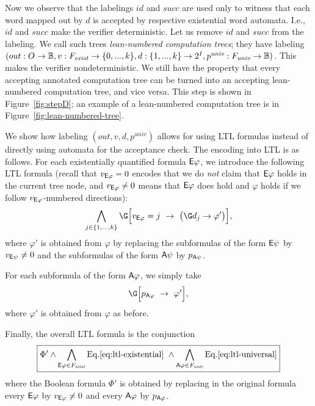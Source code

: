 
Now we observe that the labelings $id$ and $succ$
are used only to witness that each word mapped out by $d$
is accepted by respective existential word automata.
I.e., $id$ and $succ$ make the verifier deterministic.
Let us remove $id$ and $succ$ from the labeling.
We call such trees \emph{lean-numbered computation trees};
they have labeling
$
(
out:O \to \mathbb{B}, 
v:F_\textit{exist} \to \{0,...,k\},
d:\{1,...,k\} \to {2^I},
p^\textit{univ}: F_\textit{univ} \to \mathbb{B}
)
$.
This makes the verifier nondeterministic.
We still have the property that
every accepting annotated computation tree can be turned into
an accepting lean-numbered computation tree,
and vice versa.
This step is shown in Figure~\ref{fig:stepD};
an example of a lean-numbered computation tree is in Figure~\ref{fig:lean-numbered-tree}.

We show how labeling $(out,v,d,p^\textit{univ})$ 
allows for using LTL formulas instead of directly using automata for the acceptance check.
The encoding into LTL is as follows.
\li
\- For each existentially quantified formula ${\operatorname{\mathsf{E}}}\varphi$,
   we introduce the following LTL formula
   (recall that $v_{{\operatorname{\mathsf{E}}}\varphi} = 0$ encodes that we do \emph{not} claim that ${\operatorname{\mathsf{E}}}\varphi$ holds in the current     tree node,
    and $v_{{\operatorname{\mathsf{E}}}\varphi} \neq 0$ means that ${\operatorname{\mathsf{E}}}\varphi$ does hold
    and $\varphi$ holds if we follow $v_{{\operatorname{\mathsf{E}}}\varphi}$-numbered directions):
   \begin{equation}\label{eq:ltl-existential}
   \bigwedge_{j \in \{1,...,k\}} \G\Big[ v_{\E\varphi} = j ~\impl~ \big( \G d_j \impl \varphi'\big) \Big],
   \end{equation}
   where $\varphi'$ is obtained from $\varphi$
   by replacing the subformulas of the form ${\operatorname{\mathsf{E}}}\psi$ by $v_{{\operatorname{\mathsf{E}}}\psi} \neq 0$
   and the subformulas of the form ${\operatorname{\mathsf{A}}}\psi$ by $p_{{\operatorname{\mathsf{A}}}\psi}$.

\- For each subformula of the form ${\operatorname{\mathsf{A}}}\varphi$, we simply take
   \begin{equation}\label{eq:ltl-universal}
   \G\Big[ p_{\A\varphi} ~\impl~ \varphi' \Big],
   \end{equation}
   where $\varphi'$ is obtained from $\varphi$ as before.

\- Finally, the overall LTL formula is the conjunction
   \begin{equation}\label{eq:ltl-full}
   \boxed{
   \Phi' \land \bigwedge_{{\operatorname{\mathsf{E}}}\varphi \in F_\textit{exist}} \text{Eq.}\ref{eq:ltl-existential} ~\land \bigwedge_{{\operatorname{\mathsf{A}}}\varphi \in F_\textit{univ}} \text{Eq.}\ref{eq:ltl-universal}
   }
   \end{equation}
   where the Boolean formula $\Phi'$ is obtained by replacing in the original \CTLstar formula
   every ${\operatorname{\mathsf{E}}}\varphi$ by $v_{{\operatorname{\mathsf{E}}}\varphi} \neq 0$ and every ${\operatorname{\mathsf{A}}}\varphi$ by $p_{{\operatorname{\mathsf{A}}}\varphi}$.
\il

